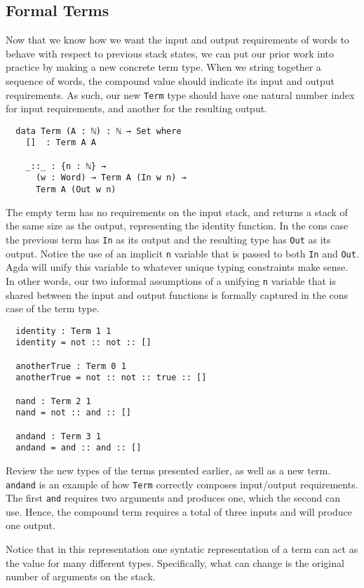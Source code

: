 \documentclass{acm_proc_article-sp}
\begin{document}
\subsection{Formal Terms}

Now that we know how we want the input and output requirements of
words to behave with respect to previous stack states, we can put our
prior work into practice by making a new concrete term type. When we
string together a sequence of words, the compound value should
indicate its input and output requirements. As such, our new
\texttt{Term} type should have one natural number index for input
requirements, and another for the resulting output.

\begin{verbatim}
  data Term (A : ℕ) : ℕ → Set where
    []  : Term A A

    _::_ : {n : ℕ} →
      (w : Word) → Term A (In w n) →
      Term A (Out w n)
\end{verbatim}

The empty term has no requirements on the input stack, and returns a
stack of the same size as the output, representing the identity
function. In the cons case the previous term has \texttt{In} as its
output and the resulting type has \texttt{Out} as its output. Notice
the use of an implicit \texttt{n} variable that is passed to both
\texttt{In} and \texttt{Out}. Agda will unify this variable to
whatever unique typing constraints make sense. In other words, our two
informal assumptions of a unifying \texttt{n} variable that is shared
between the input and output functions is formally captured in the
cons case of the term type.

\begin{verbatim}
  identity : Term 1 1
  identity = not :: not :: []

  anotherTrue : Term 0 1
  anotherTrue = not :: not :: true :: []

  nand : Term 2 1
  nand = not :: and :: []

  andand : Term 3 1
  andand = and :: and :: []
\end{verbatim}

Review the new types of the terms presented earlier, as well as a new
term. \texttt{andand} is an example of how \texttt{Term} correctly
composes input/output requirements. The first \texttt{and} requires
two arguments and produces one, which the second can use. Hence, the
compound term requires a total of three inputs and will produce one
output.

Notice that in this representation one syntatic representation of a
term can act as the value for many different types. Specifically, what
can change is the original number of arguments on the stack.
\end{document}
